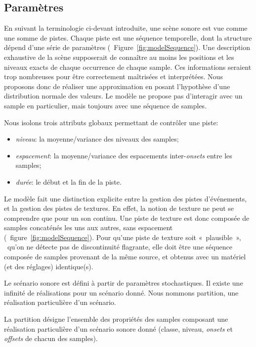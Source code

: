 \subsection{Paramètres}
\label{sec:ch4_modelParam}

En suivant la terminologie ci-devant introduite, une scène sonore est vue comme une somme de pistes. Chaque piste est une séquence temporelle, dont la structure dépend d'une série de paramètres (\cf~Figure~\ref{fig:modelSequence}). Une description exhaustive de la scène supposerait de connaître au moins les positions et les niveaux exacts de chaque occurrence de chaque sample. Ces informations seraient trop nombreuses pour être correctement maîtrisées et interprétées. Nous proposons donc de réaliser une approximation en posant l'hypothèse d'une distribution normale des valeurs. Le modèle ne propose pas d’interagir avec un sample en particulier, mais toujours avec une séquence de samples.

Nous isolons trois attributs globaux permettant de contrôler une piste:

\begin{itemize}
\item \emph{niveau}: la moyenne/variance des niveaux des samples;
\item \emph{espacement}: la moyenne/variance des espacements inter-\emph{onsets} entre les samples;
\item \emph{durée}: le début et la fin de la piste.
\end{itemize}

Le modèle fait une distinction explicite entre la gestion des pistes d'événements, et la gestion des pistes de textures. En effet, la notion de texture ne peut se comprendre que pour un son continu. Une piste de texture est donc composée de samples concaténés les uns aux autres, sans espacement (\cf~figure~\ref{fig:modelSequence}). Pour qu'une piste de texture soit «~plausible~», \ie~qu'on ne détecte pas de discontinuité flagrante, elle doit être une séquence composée de samples provenant de la même source, et obtenus avec un matériel (et des réglages) identique(s).

Le scénario sonore est défini à partir de paramètres stochastiques. Il existe une infinité de réalisations pour un scénario donné. Nous nommons partition, une réalisation particulière d'un scénario.

\begin{mydef}
La partition désigne l'ensemble des propriétés des samples composant une réalisation particulière d'un scénario sonore donné (classe, niveau, \emph{onsets} et \emph{offsets} de chacun des samples).
\end{mydef}

